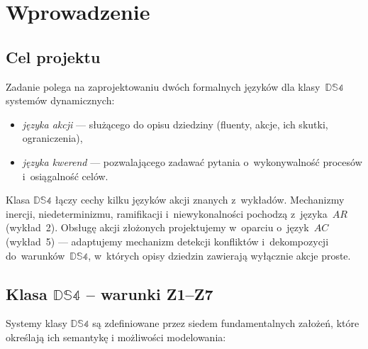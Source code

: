 \documentclass[11pt,a4paper]{article}
\theoremstyle{definition}
\begin{document}
\section{Wprowadzenie}

\subsection{Cel projektu}

Zadanie polega na zaprojektowaniu dwóch formalnych języków dla klasy~$\mathbb{DS4}$
systemów dynamicznych:
\begin{itemize}
  \item \emph{języka akcji} --- służącego do opisu dziedziny (fluenty, akcje,
        ich skutki, ograniczenia),
  \item \emph{języka kwerend} --- pozwalającego zadawać pytania o~wykonywalność
        procesów i~osiągalność celów.
\end{itemize}

Klasa $\mathbb{DS4}$ łączy cechy kilku języków akcji znanych z~wykładów.
Mechanizmy inercji, niedeterminizmu, ramifikacji i~niewykonalności
pochodzą z~języka~$AR$ (wykład~2). Obsługę akcji złożonych projektujemy
w~oparciu o~język~$AC$ (wykład~5) --- adaptujemy mechanizm detekcji
konfliktów i~dekompozycji do~warunków~$\mathbb{DS4}$,
w~których opisy dziedzin zawierają wyłącznie akcje proste.

\subsection{Klasa \texorpdfstring{$\mathbb{DS4}$}{DS4} -- warunki Z1--Z7}
Systemy klasy $\mathbb{DS4}$ są zdefiniowane przez siedem fundamentalnych założeń, które określają ich semantykę i możliwości modelowania:
\end{document}
